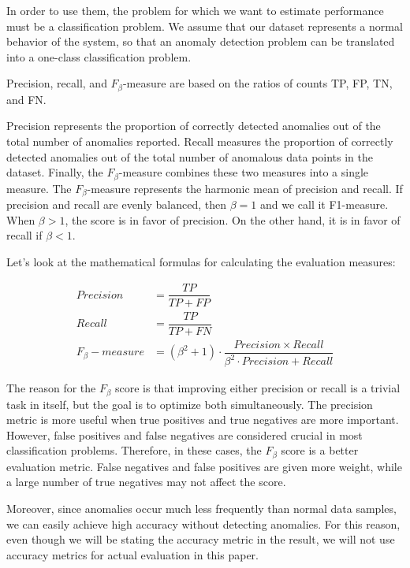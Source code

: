 In order to use them, the problem for which we want to estimate performance must be a classification problem. We assume that our dataset represents a normal behavior of the system, so that an anomaly detection problem can be translated into a one-class classification problem. 

Precision, recall, and $F_{\beta}$-measure are based on the ratios of counts TP, FP, TN, and FN. 

Precision represents the proportion of correctly detected anomalies out of the total number of anomalies reported. Recall measures the proportion of correctly detected anomalies out of the total number of anomalous data points in the dataset. Finally, the $F_{\beta}$-measure combines these two measures into a single measure. The $F_{\beta}$-measure represents the harmonic mean of precision and recall. If precision and recall are evenly balanced, then $\beta = 1$ and we call it F1-measure. When $\beta > 1$, the score is in favor of precision. On the other hand, it is in favor of recall if $\beta < 1$. 

Let's look at the mathematical formulas for calculating the evaluation measures:

\begin{align}
    Precision &= \dfrac{TP}{TP + FP} \\
    Recall &= \dfrac{TP}{TP + FN} \\
    F_{\beta}-measure &= (\beta^2 + 1) \cdot \dfrac{Precision \times Recall }{\beta^2 \cdot Precision + Recall} 
\end{align}

The reason for the $F_{\beta}$ score is that improving either precision or recall is a trivial task in itself, but the goal is to optimize both simultaneously. The precision metric is more useful when true positives and true negatives are more important. However, false positives and false negatives are considered crucial in most classification problems. Therefore, in these cases, the $F_{\beta}$ score is a better evaluation metric. False negatives and false positives are given more weight, while a large number of true negatives may not affect the score.

Moreover, since anomalies occur much less frequently than normal data samples, we can easily achieve high accuracy without detecting anomalies. For this reason, even though we will be stating the accuracy metric in the result, we will not use accuracy metrics for actual evaluation in this paper.

